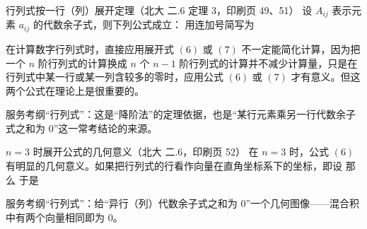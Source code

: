 \begin{fdeep}{行列式按一行（列）展开定理（北大 二.6 定理 3，印刷页 49、51）}
\quad 设
$A_{ij}$ 表示元素 $a_{ij}$ 的代数余子式，则下列公式成立：
用连加号简写为

在计算数字行列式时，直接应用展开式 $(6)$ 或 $(7)$ 不一定能简化计算，因为把一个 $n$ 阶行列式的计算换成 $n$ 个 $n-1$ 阶行列式的计算并不减少计算量，只是在行列式中某一行或某一列含较多的零时，应用公式 $(6)$ 或 $(7)$ 才有意义。但这两个公式在理论上是很重要的。

\fbref{}服务考纲“行列式”：这是“降阶法”的定理依据，也是“某行元素乘另一行代数余子式之和为 0”这一常考结论的来源。
\end{fdeep}

\begin{fdeep}{$n=3$ 时展开公式的几何意义（北大 二.6，印刷页 52）}
在 $n=3$ 时，公式 $(6)$ 有明显的几何意义。如果把行列式的行看作向量在直角坐标系下的坐标，即设
那么
于是

\fbref{}服务考纲“行列式”：给“异行（列）代数余子式之和为 0”一个几何图像——混合积中有两个向量相同即为 0。
\end{fdeep}

